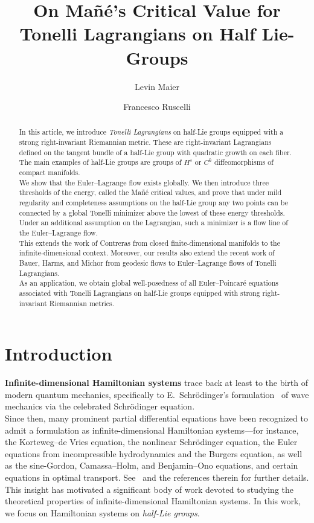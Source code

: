 \documentclass[11pt,reqno]{amsart}
\title[Tonelli Lagrangians on Half Lie-Groups]{On Mañé's Critical Value for\\ Tonelli Lagrangians on Half Lie-Groups}
\author{Levin Maier}
\author{Francesco Ruscelli}
\theoremstyle{plain}
\theoremstyle{definition}
\theoremstyle{plain} %
\theoremstyle{definition} %
\numberwithin{equation}{section}
\begin{document}
	\maketitle
\renewcommand{\abstractname}{Abstract}
	\begin{abstract}
In this article, we introduce \emph{Tonelli Lagrangians} on half-Lie groups equipped with a strong right-invariant Riemannian metric. 
These are right-invariant Lagrangians defined on the tangent bundle of a half-Lie group with quadratic growth on each fiber.
The main examples of half-Lie groups are groups of \( H^s \) or \( C^k \) diffeomorphisms of compact manifolds. \\[0.3em]
We show that the Euler–Lagrange flow exists globally. We then introduce three thresholds of the energy, called the Mañé critical values, and prove that under mild regularity and completeness assumptions on the half-Lie group any two points can be connected by a global Tonelli minimizer above the lowest of these energy thresholds. Under an additional assumption on the Lagrangian, such a minimizer is a flow line of the Euler–Lagrange flow.\\[0.3em]
This extends the work of Contreras from closed finite-dimensional manifolds to the infinite-dimensional context. 
Moreover, our results also extend the recent work of Bauer, Harms, and Michor from geodesic flows to Euler–Lagrange flows of Tonelli Lagrangians.\\[0.3em]
As an application, we obtain global well-posedness of all Euler–Poincaré equations associated with Tonelli Lagrangians on half-Lie groups equipped with strong right-invariant Riemannian metrics.
	\end{abstract}	
	\section{Introduction}\label{s:introduction}
\textbf{Infinite-dimensional Hamiltonian systems} trace back at least to the birth of modern quantum mechanics, specifically to E.~Schrödinger’s formulation~\cite{schrodinger1926quantisierung1} of wave mechanics via the celebrated Schrödinger equation. \\
Since then, many prominent partial differential equations have been recognized to admit a formulation as infinite-dimensional Hamiltonian systems—for instance, the Korteweg–de Vries equation, the nonlinear Schrödinger equation, the Euler equations from incompressible hydrodynamics and the Burgers equation, as well as the sine-Gordon, Camassa–Holm, and Benjamin–Ono equations, and certain equations in optimal transport. See~\cite{AK98, Khesin-Mis-Mod-inf-Newton} and the references therein for further details.\\
This insight has motivated a significant body of work devoted to studying the theoretical properties of infinite-dimensional Hamiltonian systems. In this work, we focus on Hamiltonian systems on \emph{half-Lie groups}. \\
\end{document}
